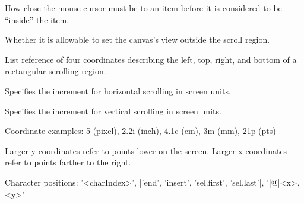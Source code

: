 \vskip5pt
\begin{enum}{1cm}

How close the mouse cursor must be to an item before it is considered
to be ``inside'' the item.

Whether it is allowable to set the canvas's view outside the scroll
region.

List reference of four coordinates describing the left, top, right, and bottom
of a rectangular scrolling region.

Specifies the increment for horizontal scrolling in screen units.

Specifies the increment for vertical scrolling in screen units.

\end{enum}

\vskip5pt
Coordinate examples: 5 (pixel), 2.2i (inch), 4.1c (cm), 3m (mm), 21p (pts)
\begin{enum}{1cm}
\Xi{} Larger y-coordinates refer to points lower on the  screen.
\Xi{} Larger x-coordinates refer to points farther to the right.
\end{enum}

\vskip5pt
Character positions: '<charIndex>', |'end', 'insert', 'sel.first', 'sel.last'|, '|@|<x>,<y>'



